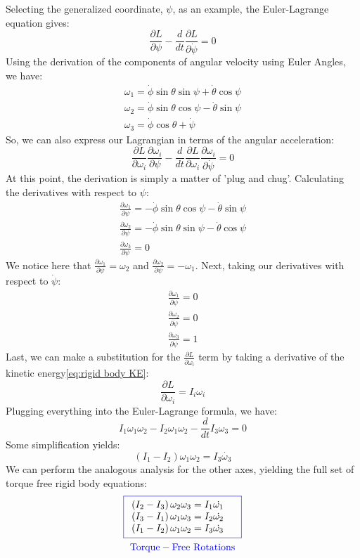 \documentclass[12pt]{report}
\begin{document}
Selecting the generalized coordinate, $\psi$, as an example, the Euler-Lagrange equation gives:
$$\frac{\partial L}{\partial \psi}-\frac{d}{dt}\frac{\partial L}{\partial \dot{\psi}}=0$$
Using the derivation of the components of angular velocity using Euler Angles, we have:
\begin{gather}
\omega_1=\dot{\phi}\sin\theta\sin\psi+\dot{\theta}\cos\psi\\
    \omega_2=\dot{\phi}\sin\theta\cos\psi-\dot{\theta}\sin\psi\\
    \omega_3=\dot{\phi}\cos\theta+\dot{\psi}
\end{gather}
So, we can also express our \gls{Lagrangian} in terms of the angular acceleration:
$$\frac{\partial L}{\partial \omega_i}\frac{\partial \omega_i}{\partial \psi}-\frac{d}{dt}\frac{\partial L}{\partial \omega_i}\frac{\partial \omega_i}{\partial \dot{\psi}}=0$$
At this point, the derivation is simply a matter of 'plug and chug'. Calculating the derivatives with respect to $\psi$:
\begin{gather}
    \frac{\partial \omega_1}{\partial \psi}=-\dot{\phi}\sin\theta\cos\psi-\dot{\theta}\sin\psi\\
    \frac{\partial \omega_2}{\partial \psi}=-\dot{\phi}\sin\theta\sin\psi-\dot{\theta}\cos\psi\\
    \frac{\partial \omega_3}{\partial \psi}=0
\end{gather}
We notice here that $\frac{\partial \omega_1}{\partial \psi}=\omega_2$ and $\frac{\partial \omega_2}{\partial \psi}=-\omega_1$. Next, taking our derivatives with respect to $\dot{\psi}$:
\begin{gather}
    \frac{\partial \omega_1}{\partial \dot{\psi}}=0\\
    \frac{\partial \omega_2}{\partial \dot{\psi}}=0\\
    \frac{\partial \omega_3}{\partial \dot{\psi}}=1
\end{gather}
Last, we can make a substitution for the $\frac{\partial L}{\partial \omega_i}$ term by taking a derivative of the kinetic energy\eqref{eq:rigid body KE}:
$$\frac{\partial L}{\partial \omega_i}=I_i\omega_i$$
Plugging everything into the Euler-Lagrange formula, we have:
$$I_1\omega_1\omega_2-I_2\omega_1\omega_2-\frac{d}{dt}I_3\omega_3=0$$
Some simplification yields:
$$\left(I_1-I_2\right)\omega_1\omega_2=I_3\dot{\omega_3}$$
We can perform the analogous analysis for the other axes, yielding the full set of torque free \gls{rigid body} equations:
\begin{gather}
\color{blue}\boxed{
\begin{array}{ll}
\color{black}
\left(I_2-I_3\right)\omega_2\omega_3=I_1\dot{\omega_1}
     &\\
     \color{black}\left(I_3-I_1\right)\omega_1\omega_3=I_2\dot{\omega_2}
     &\\
     \color{black}\left(I_1-I_2\right)\omega_1\omega_2=I_3\dot{\omega_3}
\end{array}}\\
\color{blue}
\mathrm{Torque-Free \ Rotations}
\end{gather}
\end{document}
